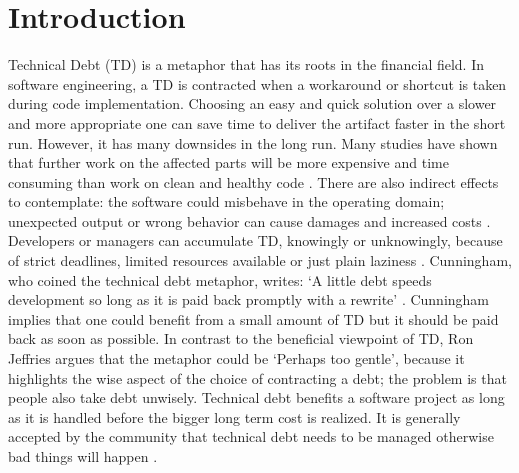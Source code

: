 \chapter{Introduction}
Technical Debt (TD) is a metaphor that has its roots in the financial field. In software engineering, a TD is contracted when a workaround or shortcut is taken during code implementation.
Choosing an easy and quick solution over a slower and more appropriate one can save time to deliver the artifact faster in the short run. However, it has many downsides in the long run. Many studies have shown that further work on the affected parts will be more expensive and time consuming than work on clean and healthy code \cite{tom2013exploration} \cite{allman2012managing} \cite{guo2016exploring} \cite{besker2018embracing} \cite{cunningham1992wycash}.
There are also indirect effects to contemplate: the software could misbehave in the operating domain; unexpected output or wrong behavior can cause damages and increased costs \cite{guo2011tracking}.
%
Developers or managers can accumulate TD, knowingly or unknowingly, because of strict deadlines, limited resources available or just plain laziness \cite{hinsen2015technical,allman2012managing}. Cunningham, who coined the technical debt metaphor, writes: `A little debt speeds development so long as it is paid back promptly with a rewrite' \cite{cunningham1992wycash}. Cunningham implies that one could benefit from a small amount of TD but it should be paid back as soon as possible. 
%
In contrast to the beneficial viewpoint of TD, Ron Jeffries argues that the metaphor could be `Perhaps too gentle', because it highlights the wise aspect of the choice of contracting a debt; the problem is that people also take debt unwisely. 
Technical debt benefits a software project as long as it is handled before the bigger long term cost is realized.
%
It is generally accepted by the community that technical debt needs to be managed otherwise bad things will happen \cite{guo2016exploring} \cite{hinsen2015technical} \cite{allman2012managing} \cite{martini2018technical}. 

